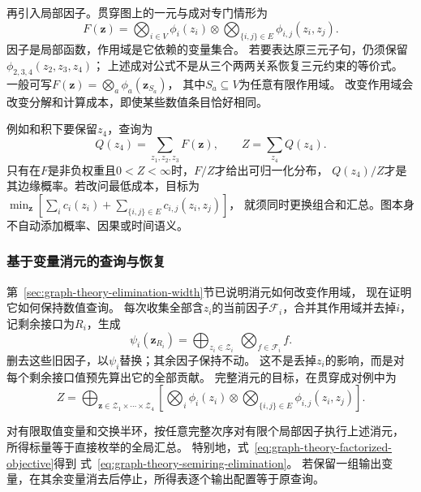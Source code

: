 再引入局部因子。贯穿图上的一元与成对专门情形为
\begin{equation}
  F(\bm z)=\bigotimes_{i\in V}\phi_i(z_i)
    \otimes\bigotimes_{\{i,j\}\in E}\phi_{i,j}(z_i,z_j).
  \label{eq:graph-theory-factorized-objective}
\end{equation}
因子是局部函数，作用域是它依赖的变量集合。
若要表达原三元子句，仍须保留\(\phi_{2,3,4}(z_2,z_3,z_4)\)；
上述成对公式不是从三个两两关系恢复三元约束的等价式。
一般可写\(F(\bm z)=\bigotimes_a\phi_a(\bm z_{S_a})\)，
其中\(S_a\subseteq V\)为任意有限作用域。
改变作用域会改变分解和计算成本，即使某些数值条目恰好相同。

例如和积下要保留\(z_4\)，查询为
\[
  Q(z_4)=\sum_{z_1,z_2,z_3}F(\bm z),\qquad
  Z=\sum_{z_4}Q(z_4).
\]
只有在\(F\)是非负权重且\(0<Z<\infty\)时，\(F/Z\)才给出可归一化分布，
\(Q(z_4)/Z\)才是其边缘概率。若改问最低成本，目标为
\(\min_{\bm z}[\sum_i c_i(z_i)+\sum_{\{i,j\}\in E}c_{i,j}(z_i,z_j)]\)，
就须同时更换组合和汇总。图本身不自动添加概率、因果或时间语义。

\subsubsection{基于变量消元的查询与恢复}

第~\ref{sec:graph-theory-elimination-width}节已说明消元如何改变作用域，
现在证明它如何保持数值查询。
每次收集全部含\(z_i\)的当前因子\(\mathcal F_i\)，合并其作用域并去掉\(i\)，
记剩余接口为\(R_i\)，生成
\[
  \psi_i(\bm z_{R_i})
  =\bigoplus_{z_i\in\mathcal Z_i}\ \bigotimes_{f\in\mathcal F_i}f.
\]
删去这些旧因子，以\(\psi_i\)替换；其余因子保持不动。
这不是丢掉\(z_i\)的影响，而是对每个剩余接口值预先算出它的全部贡献。
完整消元的目标，在贯穿成对例中为
\begin{equation}
  Z=\bigoplus_{\bm z\in\mathcal Z_1\times\cdots\times\mathcal Z_4}
  \left[
    \bigotimes_i\phi_i(z_i)
    \otimes\bigotimes_{\{i,j\}\in E}\phi_{i,j}(z_i,z_j)
  \right].
  \label{eq:graph-theory-semiring-elimination}
\end{equation}

\begin{theorem}[半环变量消除的正确性]
  \label{thm:graph-theory-semiring-elimination}
  对有限取值变量和交换半环，按任意完整次序对有限个局部因子执行上述消元，
  所得标量等于直接枚举的全局汇总。
  特别地，式~\eqref{eq:graph-theory-factorized-objective}得到
  式~\eqref{eq:graph-theory-semiring-elimination}。
  若保留一组输出变量，在其余变量消去后停止，所得表逐个输出配置等于原查询。
\end{theorem}

